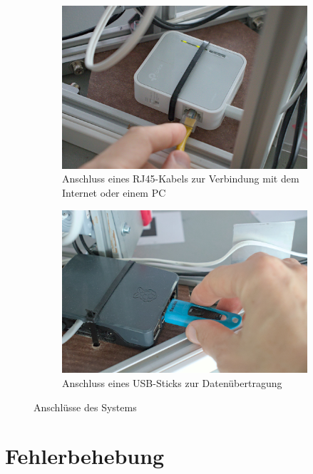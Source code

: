 \documentclass[./00PhotoBox.tex]{subfiles}
\begin{document}
\begin{figure}
    \centering
    \begin{subfigure}{0.48\textwidth}
        \includegraphics[width=1\textwidth]{img/9_anleitung/rj45.jpg}
        \caption{Anschluss eines RJ45-Kabels zur Verbindung mit dem Internet oder einem PC}
        \label{img:rj45}
    \end{subfigure}
    \begin{subfigure}{0.48\textwidth}
        \includegraphics[width=1\textwidth]{img/9_anleitung/usbstick.jpg}
        \caption{Anschluss eines USB-Sticks zur Datenübertragung}
        \label{img:usbstick}
    \end{subfigure}
    \caption{Anschlüsse des Systems}
\end{figure}

\section{Fehlerbehebung}
\label{sec:Fehlerbehebung}
\end{document}
